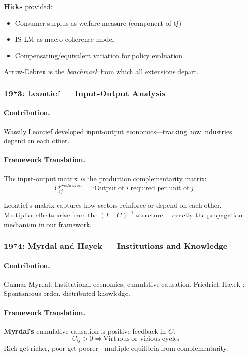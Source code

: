 \textbf{Hicks} provided:
\begin{itemize}
  \item Consumer surplus as welfare measure (component of $Q$)
  \item IS-LM as macro coherence model
  \item Compensating/equivalent variation for policy evaluation
\end{itemize}

Arrow-Debreu is the \emph{benchmark} from which all extensions depart.

\subsubsection{1973: Leontief --- Input-Output Analysis}

\paragraph{Contribution.}
Wassily Leontief developed input-output economics---tracking how
industries depend on each other.

\paragraph{Framework Translation.}
The input-output matrix \emph{is} the production complementarity matrix:
\begin{equation}
  C^{production}_{ij} = \text{``Output of } i \text{ required per unit of } j\text{''}
\end{equation}

Leontief's matrix captures how sectors reinforce or depend on each other.
Multiplier effects arise from the $(I - C)^{-1}$ structure---
exactly the propagation mechanism in our framework.

\subsubsection{1974: Myrdal and Hayek --- Institutions and Knowledge}

\paragraph{Contribution.}
Gunnar Myrdal: Institutional economics, cumulative causation.
Friedrich Hayek \citep{hayek1945}: Spontaneous order, distributed knowledge.

\paragraph{Framework Translation.}
\textbf{Myrdal's} cumulative causation is positive feedback in $C$:
\begin{equation}
  C_{ij} > 0 \Rightarrow \text{Virtuous or vicious cycles}
\end{equation}
Rich get richer, poor get poorer---multiple equilibria from complementarity.

